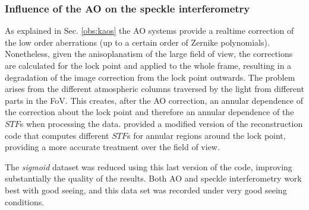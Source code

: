 \subsubsection*{Influence of the AO on the speckle interferometry\label{SIbao}}
As explained in Sec. \ref{obs:kaos} the AO systems provide a realtime correction of the low order aberrations (up to a certain order of Zernike polynomials). Nonetheless, given the anisoplanatism of the large field of view, the corrections are calculated for the lock point and applied to the whole frame, resulting in a degradation of the image correction from the lock point outwards. The problem arises from the different atmospheric columns traversed by the light from different parts in the FoV. This creates, after the AO correction, an annular dependence of the correction about the lock point and therefore an annular dependence of the $STF$s when processing the data. \cite{2006A&A...454.1011P} provided a modified version of the reconstruction code that computes different $STF$s for annular regions around the lock point, providing a more accurate treatment over the field of view.

The \emph{sigmoid} dataset was reduced using this last version of the code, improving substantially the quality of the results. Both AO and speckle interferometry work best with good seeing, and this data set was recorded under very good seeing conditions.

